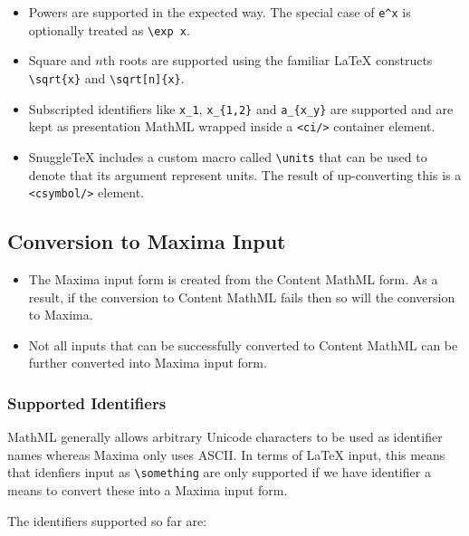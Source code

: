 \begin{itemize}

\item
  Powers are supported in the expected way. The special case of \verb|e^x|
  is optionally treated as \verb|\exp x|.

\item
  Square and $n$th roots are supported using the familiar LaTeX
  constructs \verb|\sqrt{x}| and \verb|\sqrt[n]{x}|.

\item
  Subscripted identifiers like \verb|x_1|, \verb|x_{1,2}|
  and \verb|a_{x_y}| are supported and are kept as presentation MathML wrapped
  inside a \verb|<ci/>| container element.

\item
  SnuggleTeX includes a custom macro called \verb|\units| that can be used
  to denote that its argument represent units. The result of up-converting
  this is a \verb|<csymbol/>| element.

\end{itemize}

\subsection*{Conversion to Maxima Input}

\begin{itemize}
\item
  The Maxima input form is created from the Content MathML form. As a result,
  if the conversion to Content MathML fails then so will the conversion to
  Maxima.

\item
  Not all inputs that can be successfully converted to Content MathML can
  be further converted into Maxima input form.
\end{itemize}

\subsubsection*{Supported Identifiers}

MathML generally allows arbitrary Unicode characters to be used as identifier
names whereas Maxima only uses ASCII. In terms of LaTeX input, this means that
idenfiers input as \verb|\something| are only supported if we have identifier a
means to convert these into a Maxima input form.

The identifiers supported so far are:

